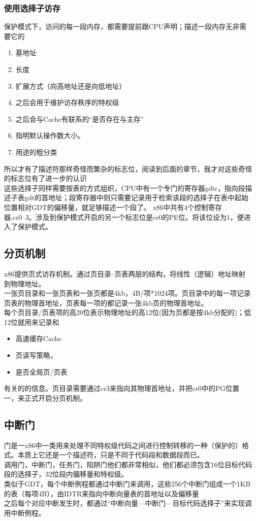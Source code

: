 \documentclass[12pt,a4paper,UTF8]{ctexart}
\begin{document}
\subsubsection*{使用选择子访存}
保护模式下，访问的每一段内存，都需要提前跟CPU声明；描述一段内存无非需要它的
\begin{enumerate}
\item 基地址
\item 长度
\item 扩展方式（向高地址还是向低地址）
\item 之后会用于维护访存秩序的特权级
\item 之后会与Cache有联系的“是否存在与主存”
\item 指明默认操作数大小。
\item 用途的粗分类
\end{enumerate}
\indent 所以才有了描述符那样奇怪而繁杂的标志位，阅读到后面的章节，我才对这些奇怪的标志位有了进一步的认识\\
\indent 这些选择子同样需要按表的方式组织，CPU中有一个专门的寄存器gdtr，指向段描述子表gdt的首地址；段寄存器中则只需要记录用于检索该段的选择子在表中起始位置相对GDT的偏移量，就足够描述一个段了。
\indent x86中共有4个控制寄存器,cr0~3。涉及到保护模式开启的另一个标志位是cr0的PE位。将该位设为1，便进入了保护模式。
\subsection{分页机制}
x86提供页式访存机制。通过页目录--页表两层的结构，将线性（逻辑）地址映射到物理地址。\\
\indent 一张页目录和一张页表和一张页都是4kb，4B/项*1024项。页目录中的每一项记录页表的物理首地址，页表每一项的都记录一张4kb页的物理首地址。\\
\indent 每个页目录/页表项的高20位表示物理地址的高12位(因为页都是按4kb分配的)；低12位就用来记录和
\begin{itemize}
\item 高速缓存Cache
\item 页读写策略，
\item 是否全局页/页表
\end{itemize}
有关的的信息。页目录需要通过cr3来指向其物理首地址，并把cr0中的PG位置一，来正式开启分页机制。
\subsection{中断门}
门是一x86中一类用来处理不同特权级代码之间进行控制转移的一种（保护的）格式。本质上它还是一个描述符，只是不同于代码段和数据段而已。\\
\indent 调用门，中断门，任务门，陷阱门他们都非常相似，他们都必须包含16位目标代码段的选择子，32位段内偏移量和特权级。\\
\indent 类似于GDT，每个中断例程都通过中断门来调用，这些256个中断门组成一个1KB的表（每项4B），由IDTR来指向中断向量表的首地址以及偏移量\\
\indent 之后每个对应中断发生时，都通过“中断向量---中断门---目标代码选择子”来实现调用中断例程。
\end{document}
